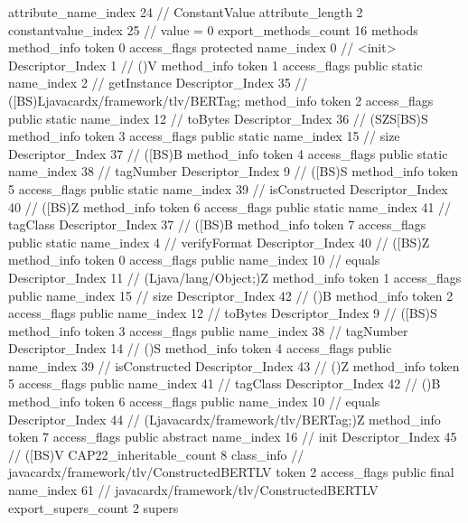 {{{{{{{					attribute_name_index	24		// ConstantValue
					attribute_length	2
					constantvalue_index	25		// value = 0
				}
				}
			}
			}
			export_methods_count	16
			methods {
				method_info {
					token	0
					access_flags	protected
					name_index	0		// <init>
					Descriptor_Index	1		// ()V
				}
				method_info {
					token	1
					access_flags	public static
					name_index	2		// getInstance
					Descriptor_Index	35		// ([BS)Ljavacardx/framework/tlv/BERTag;
				}
				method_info {
					token	2
					access_flags	public static
					name_index	12		// toBytes
					Descriptor_Index	36		// (SZS[BS)S
				}
				method_info {
					token	3
					access_flags	public static
					name_index	15		// size
					Descriptor_Index	37		// ([BS)B
				}
				method_info {
					token	4
					access_flags	public static
					name_index	38		// tagNumber
					Descriptor_Index	9		// ([BS)S
				}
				method_info {
					token	5
					access_flags	public static
					name_index	39		// isConstructed
					Descriptor_Index	40		// ([BS)Z
				}
				method_info {
					token	6
					access_flags	public static
					name_index	41		// tagClass
					Descriptor_Index	37		// ([BS)B
				}
				method_info {
					token	7
					access_flags	public static
					name_index	4		// verifyFormat
					Descriptor_Index	40		// ([BS)Z
				}
				method_info {
					token	0
					access_flags	public
					name_index	10		// equals
					Descriptor_Index	11		// (Ljava/lang/Object;)Z
				}
				method_info {
					token	1
					access_flags	public
					name_index	15		// size
					Descriptor_Index	42		// ()B
				}
				method_info {
					token	2
					access_flags	public
					name_index	12		// toBytes
					Descriptor_Index	9		// ([BS)S
				}
				method_info {
					token	3
					access_flags	public
					name_index	38		// tagNumber
					Descriptor_Index	14		// ()S
				}
				method_info {
					token	4
					access_flags	public
					name_index	39		// isConstructed
					Descriptor_Index	43		// ()Z
				}
				method_info {
					token	5
					access_flags	public
					name_index	41		// tagClass
					Descriptor_Index	42		// ()B
				}
				method_info {
					token	6
					access_flags	public
					name_index	10		// equals
					Descriptor_Index	44		// (Ljavacardx/framework/tlv/BERTag;)Z
				}
				method_info {
					token	7
					access_flags	public abstract
					name_index	16		// init
					Descriptor_Index	45		// ([BS)V
				}
			}
			CAP22_inheritable_count	8
		}
		class_info {		// javacardx/framework/tlv/ConstructedBERTLV
			token	2
			access_flags	public final
			name_index	61		// javacardx/framework/tlv/ConstructedBERTLV
			export_supers_count	2
			supers {
}}}}
